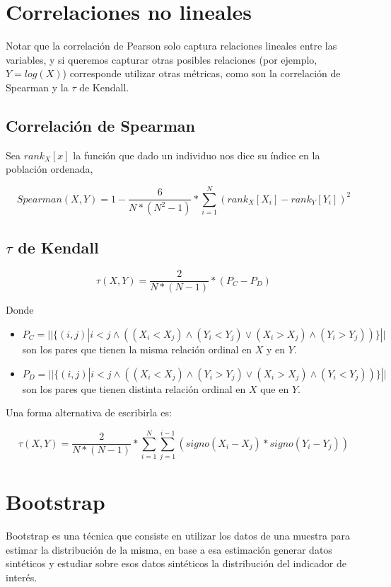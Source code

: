\section{Correlaciones no lineales}

Notar que la correlación de Pearson solo captura relaciones lineales entre las variables, y si queremos capturar otras posibles relaciones (por ejemplo, $Y = log(X)$) corresponde utilizar otras métricas, como son la correlación de Spearman y la $\tau$ de Kendall.

\subsection{Correlación de Spearman}

Sea $rank_X[x]$ la función que dado un individuo nos dice su índice en la población ordenada,

$$
    Spearman(X,Y) = 1 - \frac{6}{N*(N^2-1)} * \sum_{i=1}^N (rank_X[X_i]-rank_Y[Y_i])^2
$$

\subsection{$\tau$ de Kendall}

$$
    \tau(X,Y) = \frac{2}{N*(N-1)} * ( P_C - P_D )
$$

Donde 

\begin{itemize}
    \item $P_C = ||\{(i,j)| i<j \wedge ( (X_i < X_j) \wedge (Y_i < Y_j) \vee (X_i > X_j) \wedge (Y_i > Y_j))\}||$ son los pares que tienen la misma relación ordinal en $X$ y en $Y$.
    \item $P_D = ||\{(i,j)| i<j \wedge ( (X_i < X_j) \wedge (Y_i > Y_j) \vee (X_i > X_j) \wedge (Y_i < Y_j))\}||$ son los pares que tienen distinta relación ordinal en $X$ que en $Y$.
\end{itemize}

Una forma alternativa de escribirla es:

$$
    \tau(X,Y) = \frac{2}{N*(N-1)} * \sum_{i=1}^{N} \sum_{j=1}^{i-1} (signo(X_i-X_j) * signo(Y_i-Y_j))
$$

\section{Bootstrap}

Bootstrap es una técnica que consiste en utilizar los datos de una muestra para estimar la distribución de la misma, en base a esa estimación generar datos sintéticos y estudiar sobre esos datos sintéticos la distribución del indicador de interés.

